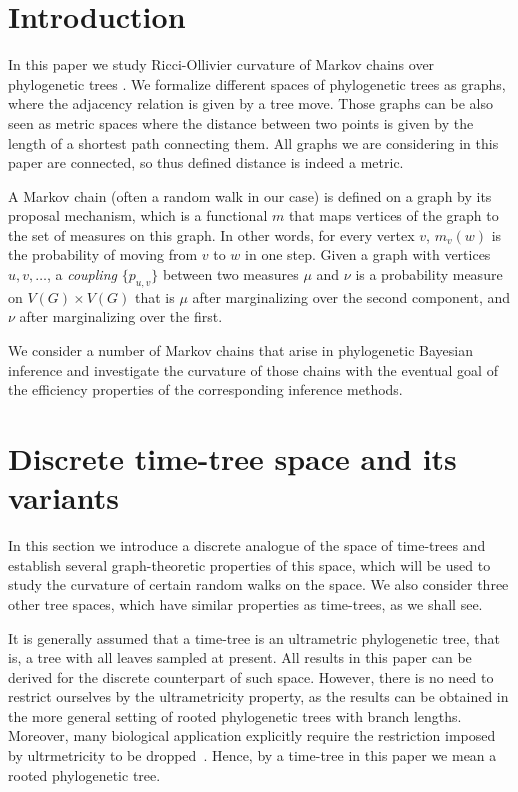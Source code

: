 \documentclass{amsart}
\begin{document}
\section{Introduction}

In this paper we study Ricci-Ollivier curvature of Markov chains over phylogenetic trees \cite{Ollivier2009-cj}.
We formalize different spaces of phylogenetic trees as graphs, where the adjacency
relation is given by a tree move. Those graphs can be also seen as metric
spaces where the distance between two points is given by the length of a
shortest path connecting them. All graphs we are considering in this paper are
connected, so thus defined distance is indeed a metric.

A Markov chain (often a random walk in our case) is defined on a graph by its
proposal mechanism, which is a functional $m$ that maps vertices of the graph to
the set of measures on this graph. In other words, for every vertex $v$,
$m_v(w)$ is the probability of moving from $v$ to $w$ in one step.
Given a graph with vertices ${u, v, \ldots}$, a \emph{coupling} $\{p_{u,v}\}$ between two measures $\mu$ and $\nu$ is a probability measure on $V(G) \times V(G)$ that is $\mu$ after marginalizing over the second component, and $\nu$ after marginalizing over the first.

We consider a number of Markov chains that arise in phylogenetic Bayesian inference and investigate the curvature of those chains with the eventual goal of the efficiency properties of the corresponding inference methods.

\section{Discrete time-tree space and its variants}

In this section we introduce a discrete analogue of the space of time-trees and establish several graph-theoretic properties of this space, which will be used to study the curvature of certain random walks on the space.
We also consider three other tree spaces, which have similar properties as time-trees, as we shall see.

It is generally assumed that a time-tree is an ultrametric phylogenetic tree, that is, a tree with all leaves sampled at present.
All results in this paper can be derived for the discrete counterpart of such space.
However, there is no need to restrict ourselves by the ultrametricity property, as the results can be obtained in the more general setting of rooted phylogenetic trees with branch lengths.
Moreover, many biological application explicitly require the restriction imposed by ultrmetricity to be dropped~\cite{}.
Hence, by a time-tree in this paper we mean a rooted phylogenetic tree.
\end{document}
